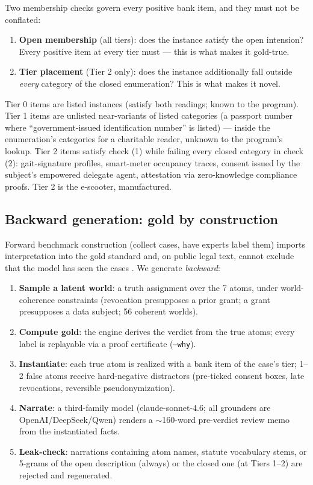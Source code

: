 Two membership checks govern every positive bank item, and they must not be
conflated:
\begin{enumerate}
\item \textbf{Open membership} (all tiers): does the instance satisfy the
  open intension? Every positive item at every tier must --- this is what
  makes it gold-true.
\item \textbf{Tier placement} (Tier 2 only): does the instance additionally
  fall outside \emph{every} category of the closed enumeration? This is what
  makes it novel.
\end{enumerate}
Tier 0 items are listed instances (satisfy both readings; known to the
program). Tier 1 items are unlisted near-variants of listed categories (a
passport number where ``government-issued identification number'' is listed)
--- inside the enumeration's categories for a charitable reader, unknown to
the program's lookup. Tier 2 items satisfy check (1) while failing every
closed category in check (2): gait-signature profiles, smart-meter occupancy
traces, consent issued by the subject's empowered delegate agent, attestation
via zero-knowledge compliance proofs. Tier 2 is the e-scooter, manufactured.

\subsection{Backward generation: gold by construction}
\label{sec:generation}

Forward benchmark construction (collect cases, have experts label them)
imports interpretation into the gold standard and, on public legal text,
cannot exclude that the model has seen the cases
\citep{sainz2023contamination}. We generate \emph{backward}:

\begin{enumerate}
\item \textbf{Sample a latent world}: a truth assignment over the 7 atoms,
  under world-coherence constraints (revocation presupposes a prior grant; a
  grant presupposes a data subject; 56 coherent worlds).
\item \textbf{Compute gold}: the engine derives the verdict from the true
  atoms; every label is replayable via a proof certificate (\texttt{--why}).
\item \textbf{Instantiate}: each true atom is realized with a bank item of
  the case's tier; 1--2 false atoms receive hard-negative distractors
  (pre-ticked consent boxes, late revocations, reversible pseudonymization).
\item \textbf{Narrate}: a third-family model (claude-sonnet-4.6; all
  grounders are OpenAI/DeepSeek/Qwen) renders a $\sim$160-word pre-verdict
  review memo from the instantiated facts.
\item \textbf{Leak-check}: narrations containing atom names, statute
  vocabulary stems, or 5-grams of the open description (always) or the closed
  one (at Tiers 1--2) are rejected and regenerated.
\end{enumerate}

